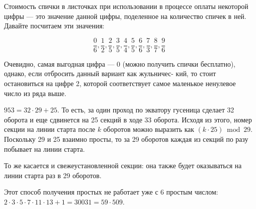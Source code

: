 ﻿
\begin{itemize}
\itA Стоимость спички в листочках при использовании в процессе
оплаты некоторой цифры --- это значение данной цифры, 
поделенное на количество спичек в ней. Давайте посчитаем эти значения:

$$\frac{0}{6}, \frac{1}{2}, \frac{2}{5}, \frac{3}{5}, \frac{4}{4}, \frac{5}{5}, \frac{6}{6}, \frac{7}{3}, \frac{8}{7}, \frac{9}{6}$$

Очевидно, самая выгодная цифра --- 0 (можно получить спички бесплатно), однако, если
отбросить данный вариант как жульничес-\linebreak
кий, то стоит остановиться на цифре 2, которой соответствует
самое маленькое ненулевое число из ряда выше.

\itB $953 = 32 \cdot 29 + 25$. То есть, за один проход по экватору 
гусеница сделает 32 оборота и еще сдвинется на 25
секций в ходе 33 оборота. Исходя из этого, номер секции на линии старта после $k$ оборотов можно
выразить как $(k \cdot 25) \bmod 29$. Поскольку 29 и 25 взаимно просты, то за 29 оборотов каждая из 
секций по разу побывает
на линии старта.

То же касается и свежеустановленной секции: она также будет оказываться 
на линии старта раз в 29 оборотов. 

\itC Этот способ получения простых не работает уже с 6 
простым числом: $2\cdot 3 \cdot 5 \cdot 7 \cdot 11 \cdot 13 + 1 = 30031 = 59 \cdot 509$.

\end{itemize}

